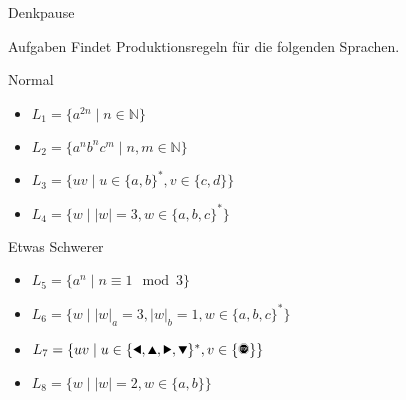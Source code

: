 {
\begin{frame}{Denkpause}
    \begin{alertblock}{Aufgaben}
    Findet Produktionsregeln für die folgenden Sprachen.
    \end{alertblock}
    \begin{block}{Normal}
    \begin{itemize}
        \item $L_1 = \{a^{2n} \mid n\in\mathbb{N}\}$
        \item $L_2 = \{a^nb^nc^m \mid n, m\in\mathbb{N}\}$
        \item $L_3 = \{uv \mid u\in\{a,b\}^\ast, v\in\{c,d\}\}$
        \item $L_4 = \{w \mid |w| = 3, w\in \{a,b,c\}^*\}$
    \end{itemize}
    \end{block}
    \begin{block}{Etwas Schwerer}
    \begin{itemize}
        \item $L_5 = \{a^n \mid n \equiv 1 \mod 3\}$
        \item $L_6 = \{w \mid |w|_a = 3, |w|_b = 1, w\in \{a,b,c\}^*\}$
        \item $L_7 = \{uv \mid u\in\{\text{\Rewind}, \text{\MoveUp}, \text{\Forward}, \text{\MoveDown}\}^\ast, v\in\{\text{\Stopsign}\}\}$
        \item $L_8 = \{w\mid |w|=2, w \in \{a, b\}\}$
    \end{itemize}
    \end{block}
\end{frame}
}

